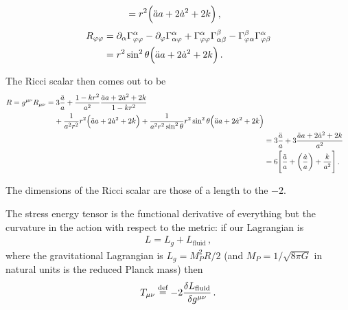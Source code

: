 \documentclass[main.tex]{subfiles}
\begin{document}
\begin{claim}
\begin{subequations}
\begin{align}
&= r^2 \qty(\ddot{a} a + 2\dot{a}^2 + 2k)
\,,
\end{align} 
\end{subequations}
%
\begin{subequations}
\begin{align}
R_{ \varphi \varphi } &= \partial_{\alpha } \Gamma^{\alpha }_{\varphi \varphi } - \partial_{\varphi } \Gamma^{\alpha }_{\alpha \varphi } + \Gamma^{\alpha }_{\varphi \varphi } \Gamma^{\beta }_{\alpha \beta } - \Gamma^{\beta }_{\varphi \alpha } \Gamma^{\alpha }_{\varphi \beta }  \\
&= r^2 \sin^2\theta \qty(\ddot{a} a + 2 \dot{a}^2 + 2k) 
\,.
\end{align}
\end{subequations}
\end{claim}

The Ricci scalar then comes out to be 
%
\begin{subequations}
\begin{align}
\begin{split}
R = g^{\mu \nu } R_{\mu \nu } 
&= 3 \frac{\ddot{a}}{a} 
+ \frac{1-kr^2}{a^2} \frac{\ddot{a}
 a + 2 \dot{a}^2 + 2k}{1 - kr^2} \\
 &\phantom{=}\ 
+ \frac{1}{a^2r^2} r^2 \qty(\ddot{a} a + 2 \dot{a}^2 + 2k)
+ \frac{1}{a^2r^2 \sin^2\theta }
r^2 \sin^2\theta  \qty(\ddot{a} a + 2 \dot{a}^2 + 2k) 
\end{split}
\\
&= 3 \frac{\ddot{a}}{a} + 3 \frac{\ddot{a}a + 2 \dot{a}^2 + 2k}{a^2}
\\
&= 6 \qty[\frac{\ddot{a}}{a} + \qty(\frac{\dot{a}}{a}) + \frac{k}{a^2}]
\,.
\end{align}
\end{subequations}

The dimensions of the Ricci scalar are those of a length to the \(-2\). 

The stress energy tensor is the functional derivative of everything but the curvature in the action with respect to the metric: if our Lagrangian is 
%
\begin{align}
L = L_{g} + L_{\text{fluid}}
\,,
\end{align}
%
where the gravitational Lagrangian is \(L_{g} = M_P^2 R /2 \) (and \(M_P = 1 / \sqrt{8 \pi G}\) in natural units is the reduced Planck mass) then 
%
\begin{align}
T_{\mu \nu } \overset{\text{def}}{=} -2 \fdv{L_{\text{fluid}}}{g^{\mu \nu }}
\,.
\end{align}
\end{document}
